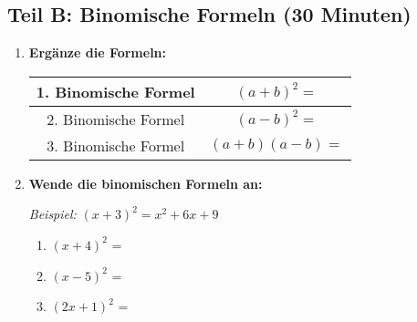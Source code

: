 \subsection*{Teil B: Binomische Formeln (30 Minuten)}

    \begin{enumerate}[label=\arabic*.,resume]

    \item \textbf{Ergänze die Formeln:}

    \begin{center}
        \begin{tabular}{|c|c|}
            \hline
            1. Binomische Formel & $(a + b)^2 = $ \underline{\hspace{6cm}} \\[2ex]
            \hline
            2. Binomische Formel & $(a - b)^2 = $ \underline{\hspace{6cm}} \\[2ex]  
            \hline
            3. Binomische Formel & $(a + b)(a - b) = $ \underline{\hspace{6cm}} \\[2ex]
            \hline
        \end{tabular}
    \end{center}

    \vspace{1cm}

    \item \textbf{Wende die binomischen Formeln an:}

    \textit{Beispiel:} $(x + 3)^2 = x^2 + 6x + 9$

    \vspace{0.5cm}
    \begin{enumerate}[label=\alph*)]
        \item $(x + 4)^2$ = \underline{\hspace{6cm}}

        \vspace{0.8cm}

        \item $(x - 5)^2$ = \underline{\hspace{6cm}}

        \vspace{0.8cm}

        \item $(2x + 1)^2$ = \underline{\hspace{6cm}}

        \vspace{0.8cm}


\end{enumerate}
\end{enumerate}
